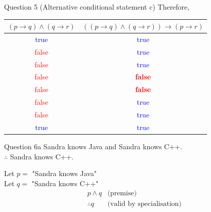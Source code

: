 \documentclass[10pt]{beamer}
\begin{document}
\begin{frame}[fragile]{Question 5 (Alternative conditional statement c)}
Therefore,
\begin{table}
\centering
\begin{tabular}{|c|c|} 
\hline
$(p \rightarrow q) \land (q \rightarrow r)$  & $((p \rightarrow q) \land (q \rightarrow r)) \rightarrow (p \rightarrow r) $   \\ 
\hline
\textcolor{blue}{true}                       & \textcolor{blue}{true}                                                         \\ 
\hline
\textcolor{red}{false}                       & \textcolor{blue}{true}                                                         \\ 
\hline
\textcolor{red}{false}                       & \textcolor{blue}{true}                                                         \\ 
\hline
\textcolor{red}{false}                       & \textcolor{red}{\textbf{false}}                                                         \\ 
\hline
\textcolor{red}{false}                       & \textcolor{red}{\textbf{false}}                                                         \\ 
\hline
\textcolor{red}{false}                       & \textcolor{blue}{true}                                                         \\ 
\hline
\textcolor{red}{false}                       & \textcolor{blue}{true}                                                         \\ 
\hline
\textcolor{blue}{true}                       & \textcolor{blue}{true}                                                         \\
\hline
\end{tabular}
\end{table}
\end{frame}


\begin{frame}[fragile]{Question 6a}
    Sandra knows Java and Sandra knows C++. \\
    $\therefore$ Sandra knows C++. \par
    Let $p =$ "Sandra knows Java" \\
    Let $q =$ "Sandra knows C++" 
\begin{align*}
    &p \land q &\text{(premise)} \\
    &\therefore q &\text{(valid by specialisation)}
\end{align*}
\end{frame}
\end{document}
